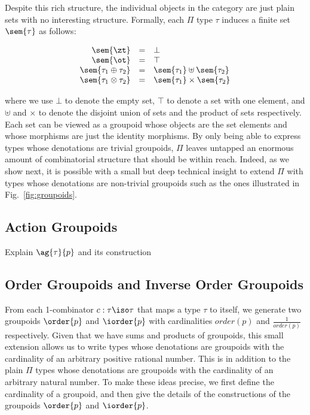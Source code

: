 Despite this rich structure, the individual objects in the category
are just plain sets with no interesting structure. Formally, each
$\Pi$ type $\tau$ induces a finite set $\sem{\tau}$ as follows:

\[\begin{array}{rcl}
\sem{\zt} &=& \bot \\
\sem{\ot} &=& \top \\
\sem{\tau_1 \oplus \tau_2} &=& \sem{\tau_1} \uplus \sem{\tau_2} \\
\sem{\tau_1 \otimes \tau_2} &=& \sem{\tau_1} \times \sem{\tau_2}
\end{array}\]

\noindent where we use $\bot$ to denote the empty set, $\top$ to
denote a set with one element, and $\uplus$ and $\times$ to denote the
disjoint union of sets and the product of sets respectively. Each set
can be viewed as a groupoid whose objects are the set elements and
whose morphisms are just the identity morphisms. By only being able to
express types whose denotations are trivial groupoids, $\Pi$ leaves
untapped an enormous amount of combinatorial structure that should be
within reach. Indeed, as we show next, it is possible with a small but
deep technical insight to extend $\Pi$ with types whose denotations
are non-trivial groupoids such as the ones illustrated in
Fig.~\ref{fig:groupoids}.

\subsection{Action Groupoids} 

Explain $\ag{\tau}{p}$ and its construction
 
\subsection{Order Groupoids and Inverse Order Groupoids} 
 
From each 1-combinator $c : \tau \iso \tau$ that maps a type $\tau$ to
itself, we generate two groupoids $\order{p}$ and $\iorder{p}$ with
cardinalities $\mathit{order}(p)$ and $\frac{1}{\mathit{order}(p)}$
respectively. Given that we have sums and products of groupoids, this
small extension allows us to write types whose denotations are
groupoids with the cardinality of an arbitrary positive rational
number. This is in addition to the plain $\Pi$ types whose denotations
are groupoids with the cardinality of an arbitrary natural number. To
make these ideas precise, we first define the cardinality of a
groupoid, and then give the details of the constructions of the
groupoids $\order{p}$ and $\iorder{p}$.

